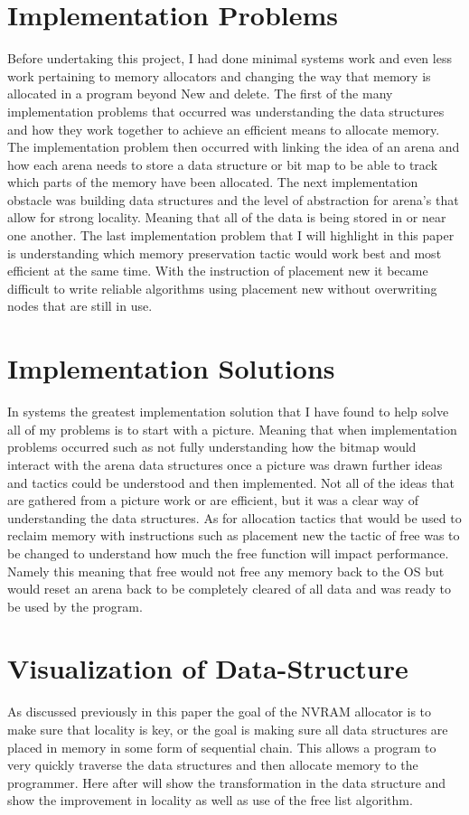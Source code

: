 \documentclass[conference]{IEEEtran}
\begin{document}
\section{Implementation Problems}
Before undertaking this project, I had done minimal systems work and even less work pertaining to memory allocators and changing the way that memory is allocated in a program beyond New and delete. The first of the many implementation problems that occurred was understanding the data structures and how they work together to achieve an efficient means to allocate memory. The implementation problem then occurred with linking the idea of an arena and how each arena needs to store a data structure or bit map to be able to track which parts of the memory have been allocated. The next implementation obstacle was building data structures and the level of abstraction for arena’s that allow for strong locality. Meaning that all of the data is being stored in or near one another. The last implementation problem that I will highlight in this paper is understanding which memory preservation tactic would work best and most efficient at the same time. With the instruction of placement new it became difficult to write reliable algorithms using placement new without overwriting nodes that are still in use.  
\section{Implementation Solutions}
In systems the greatest implementation solution that I have found to help solve all of my problems is to start with a picture. Meaning that when implementation problems occurred such as not fully understanding how the bitmap would interact with the arena data structures once a picture was drawn further ideas and tactics could be understood and then implemented. Not all of the ideas that are gathered from a picture work or are efficient, but it was a clear way of understanding the data structures. As for allocation tactics that would be used to reclaim memory with instructions such as placement new the tactic of free was to be changed to understand how much the free function will impact performance. Namely this meaning that free would not free any memory back to the OS but would reset an arena back to be completely cleared of all data and was ready to be used by the program. 
\section{Visualization of Data-Structure} 
As discussed previously in this paper the goal of the NVRAM allocator is to make sure that locality is key, or the goal is making sure all data structures are placed in memory in some form of sequential chain. This allows a program to very quickly traverse the data structures and then allocate memory to the programmer. Here after will show the transformation in the data structure and show the improvement in locality as well as use of the free list algorithm. 
\end{document}

